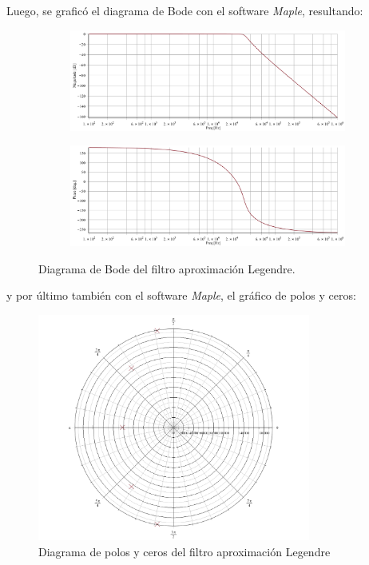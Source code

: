 Luego, se graficó el diagrama de Bode con el software \textit{Maple}, resultando:
\begin{figure}[H]
\centering
	\begin{subfigure}{\textwidth}
	\centering
	\includegraphics[width=\textwidth]{Imagenes-Ej1/legendre_hs.png}
	\end{subfigure}
	
	\begin{subfigure}{\textwidth}
	\centering
	\includegraphics[width=\textwidth]{Imagenes-Ej1/legendre_hspha.png}
	\end{subfigure}
	\label{fig:bodebes}
	\caption{Diagrama de Bode del filtro aproximación Legendre.}
\end{figure}
y por último también con el software \textit{Maple}, el gráfico de polos y ceros:

\begin{figure}[H]
\centering
	\centering
	\includegraphics[width=0.8\textwidth]{Imagenes-Ej1/legendre_poles.png}
	\caption{Diagrama de polos y ceros del filtro aproximación Legendre}
	\label{leg_poles}
\end{figure}

